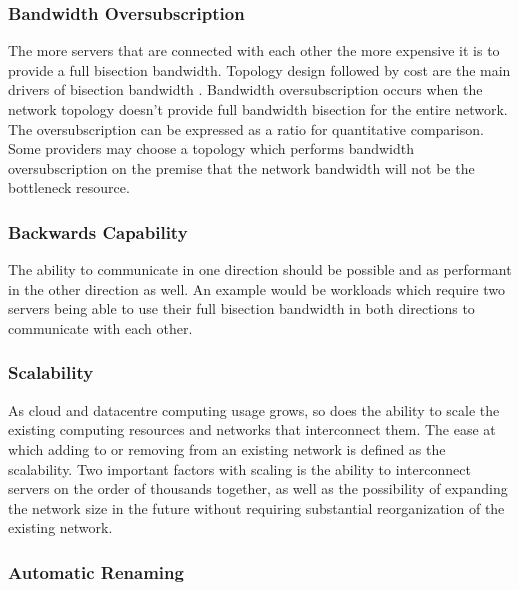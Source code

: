 \documentclass[12pt]{article}
\begin{document}
\subsubsection{Bandwidth Oversubscription} \label{ssub:bandwidth-oversubscription}

The more servers that are connected with each other the more expensive it is to provide a full bisection bandwidth. Topology design followed by cost are the main drivers of bisection bandwidth \cite{wang2015survey}. Bandwidth oversubscription occurs when the network topology doesn't provide full bandwidth bisection for the entire network. The oversubscription can be expressed as a ratio for quantitative comparison. Some providers may choose a topology which performs bandwidth oversubscription on the premise that the network bandwidth will not be the bottleneck resource.


\subsubsection{Backwards Capability} \label{ssub:backwards-capability}

The ability to communicate in one direction should be possible and as performant in the other direction as well. An example would be workloads which require two servers being able to use their full bisection bandwidth in both directions to communicate with each other.


\subsubsection{Scalability} \label{ssub:net-scalability}

As cloud and datacentre computing usage grows, so does the ability to scale the existing computing resources and networks that interconnect them. The ease at which adding to or removing from an existing network is defined as the scalability. Two important factors with scaling is the ability to interconnect servers on the order of thousands together, as well as the possibility of expanding the network size in the future without requiring substantial reorganization of the existing network.


\subsubsection{Automatic Renaming} \label{ssub:auto-renaming}
\end{document}
